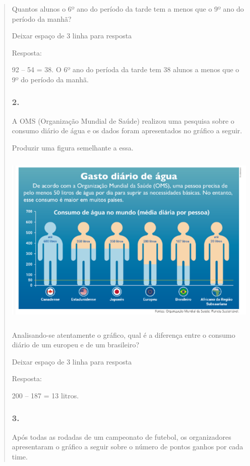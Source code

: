 \begin{enumerate}
\begin{escolha}
\begin{enumerate}
\begin{itemize}
\begin{itemize}
\begin{escolha}
\begin{quote}
\begin{escolha}
{Quantos alunos o 6º ano do período da tarde tem a menos que o 9º
ano do período da manhã?

Deixar espaço de 3 linha para resposta

Resposta:

92 -- 54 = 38. O 6º ano do períoda da tarde tem 38 alunos a
menos que o 9º do período da manhã.

\subsubsection{2.}\label{section-92}

A OMS (Organização Mundial de Saúde) realizou uma pesquisa sobre o
consumo diário de água e os dados foram apresentados no gráfico a seguir.

Produzir uma figura semelhante a essa.

\includegraphics[width=5.22545in,height=3.31695in]{media/image95.png}

Analisando-se atentamente o gráfico, qual é a diferença entre o
consumo diário de um europeu e de um brasileiro?

Deixar espaço de 3 linha para resposta

Resposta:

200 -- 187 = 13 litros.

\subsubsection{3.}\label{section-93}

Após todas as rodadas de um campeonato de futebol, os organizadores
apresentaram o gráfico a seguir sobre o número de pontos ganhos por cada
time.

}
\end{escolha}
\end{quote}
\end{escolha}
\end{itemize}
\end{itemize}
\end{enumerate}
\end{escolha}
\end{enumerate}
